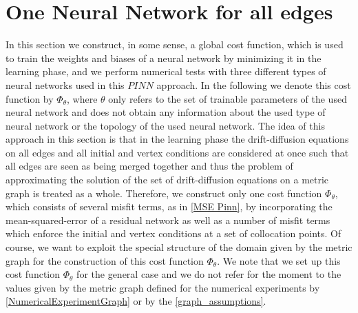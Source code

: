 \section{One Neural Network for all edges}
\label{ch3:sec1}

In this section we construct, in some sense, a global cost function, which is used to train the weights and biases of a neural network by minimizing it in the learning phase, and we perform numerical tests with three different types of neural networks used in this $PINN$ approach. In the following we denote this cost function by $\Phi_\theta$, where $\theta$ only refers to the set of trainable parameters of the used neural network and does not obtain any information about the used type of neural network or the topology of the used neural network. The idea of this approach in this section is that in the learning phase the drift-diffusion equations on all edges and all initial and vertex conditions are considered at once such that all edges are seen as being merged together and thus the problem of approximating the solution of the set of drift-diffusion equations on a metric graph is treated as a whole. Therefore, we construct only one cost function $\Phi_\theta$, which consists of several misfit terms, as in \cref{MSE Pinn}, by incorporating the mean-squared-error of a residual network as well as a number of misfit terms which enforce the initial and vertex conditions at a set of collocation points. Of course, we want to exploit the special structure of the domain given by the metric graph for the construction of this cost function $\Phi_\theta$. We note that we set up this cost function $\Phi_\theta$ for the general case and we do not refer for the moment to the values given by the metric graph defined for the numerical experiments by \cref{NumericalExperimentGraph} or by the \cref{graph_assumptions}. \\

